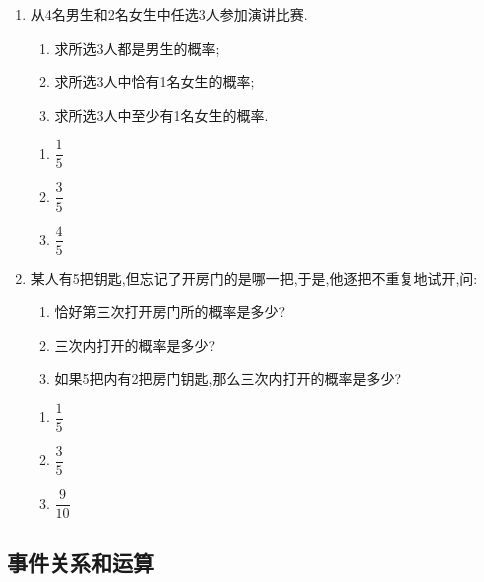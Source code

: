 \begin{enumerate}
\item 从4名男生和2名女生中任选3人参加演讲比赛.
\begin{enumerate}
\item 求所选3人都是男生的概率;
\item 求所选3人中恰有1名女生的概率;
\item 求所选3人中至少有1名女生的概率.
\end{enumerate}
\begin{jieda}
    \begin{enumerate}
        \item $\dfrac{1}{5}$
        \item $\dfrac{3}{5}$
        \item $\dfrac{4}{5}$
    \end{enumerate}
\end{jieda}


\item 某人有5把钥匙,但忘记了开房门的是哪一把,于是,他逐把不重复地试开,问:
\begin{enumerate}
\item 恰好第三次打开房门所的概率是多少?
\item 三次内打开的概率是多少?
\item 如果5把内有2把房门钥匙,那么三次内打开的概率是多少?
\end{enumerate}
\begin{jieda}
    \begin{enumerate}
        \item $\dfrac{1}{5}$
        \item $\dfrac{3}{5}$
        \item $\dfrac{9}{10}$
    \end{enumerate}
\end{jieda}
    
\end{enumerate}


\clearpage

\subsection*{事件关系和运算}


